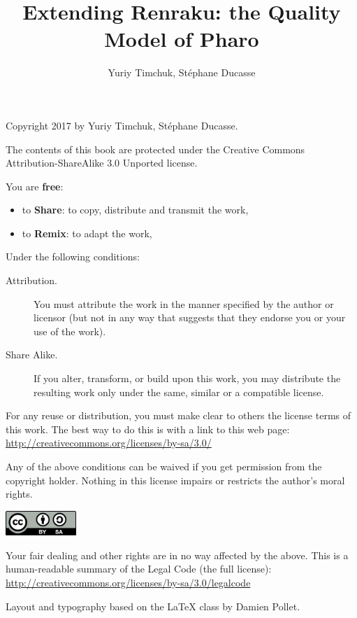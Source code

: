 \documentclass[10pt,twoside,english]{_support/latex/sbabook/sbabook}
\title{Extending Renraku: the Quality Model of Pharo}
\author{Yuriy Timchuk, Stéphane Ducasse}
\begin{document}
\maketitle
\pagestyle{titlingpage}
\thispagestyle{titlingpage} %

\cleartoverso
{\small

  Copyright 2017 by Yuriy Timchuk, Stéphane Ducasse.

  The contents of this book are protected under the Creative Commons
  Attribution-ShareAlike 3.0 Unported license.

  You are \textbf{free}:
  \begin{itemize}
  \item to \textbf{Share}: to copy, distribute and transmit the work,
  \item to \textbf{Remix}: to adapt the work,
  \end{itemize}

  Under the following conditions:
  \begin{description}
  \item[Attribution.] You must attribute the work in the manner specified by the
    author or licensor (but not in any way that suggests that they endorse you
    or your use of the work).
  \item[Share Alike.] If you alter, transform, or build upon this work, you may
    distribute the resulting work only under the same, similar or a compatible
    license.
  \end{description}

  For any reuse or distribution, you must make clear to others the
  license terms of this work. The best way to do this is with a link to
  this web page: \\
  \url{http://creativecommons.org/licenses/by-sa/3.0/}

  Any of the above conditions can be waived if you get permission from
  the copyright holder. Nothing in this license impairs or restricts the
  author's moral rights.

  \begin{center}
    \includegraphics[width=0.2\textwidth]{_support/latex/sbabook/CreativeCommons-BY-SA.pdf}
  \end{center}

  Your fair dealing and other rights are in no way affected by the
  above. This is a human-readable summary of the Legal Code (the full
  license): \\
  \url{http://creativecommons.org/licenses/by-sa/3.0/legalcode}

  \vfill

  Layout and typography based on the  \LaTeX{} class by Damien
  Pollet.
}
\end{document}
